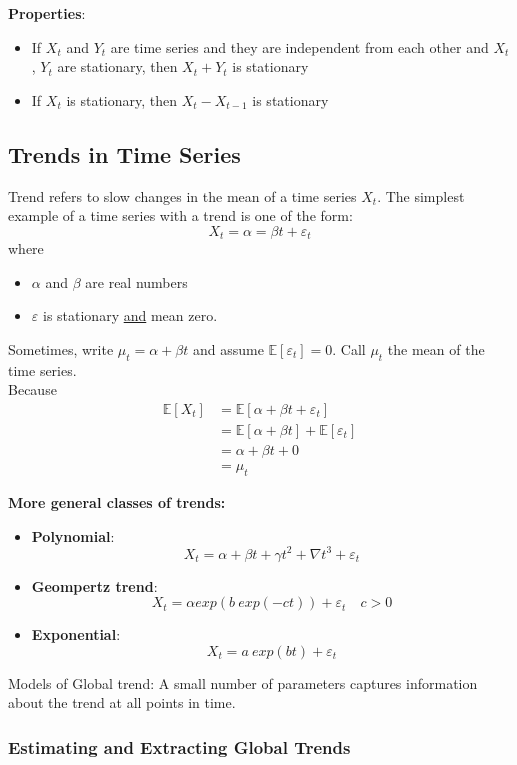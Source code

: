 \textbf{Properties}:
\begin{itemize}
    \item If $X_t$ and $Y_t$ are time series and they are independent from each other and $X_t$, $Y_t$ are stationary, then $X_t + Y_t$ is stationary
    \item If $X_t$ is stationary, then $X_t - X_{t-1}$ is stationary
\end{itemize}


\subsection{Trends in Time Series}

Trend refers to slow changes in the mean of a time series $X_t$. The simplest example of a time series with a trend is one of the form:\[
X_t = \alpha = \beta t + \varepsilon_t
\]
where \begin{itemize}
    \item $\alpha$ and $\beta$ are real numbers
    \item $\varepsilon$ is stationary \underline{and} mean zero.
\end{itemize}
Sometimes, write $\mu_t = \alpha + \beta t$ and assume $\mathbb{E}[\varepsilon_t]=0$. Call $\mu_t$ the mean of the time series. \\

Because
\begin{align*}
    \mathbb{E}[X_t] &= \mathbb{E}[\alpha + \beta t + \varepsilon_t] \\
    &= \mathbb{E}[\alpha + \beta t] + \mathbb{E}[\varepsilon_t] \\
    &= \alpha + \beta t + 0\\
    &= \mu_t
\end{align*}

\textbf{More general classes of trends:}
\begin{itemize}
    \item \textbf{Polynomial}: 
    \[X_t=\alpha+\beta t +\gamma t^2 + \nabla t^3 + \varepsilon_t\]
    \item \textbf{Geompertz trend}:
    \[X_t = \alpha exp(b\ exp(-ct)) + \varepsilon_t \quad c>0\]
    \item \textbf{Exponential}:
    \[X_t =a\ exp(bt) + \varepsilon_t\]
\end{itemize}
Models of Global trend: A small number of parameters captures information about the trend at all points in time.

\subsubsection{Estimating and Extracting Global Trends}

